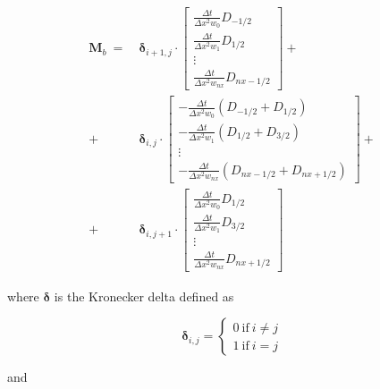 \documentclass[journal abbreviation, manuscript]{copernicus}
\begin{document}
\begin{equation}
\begin{aligned}
    \boldsymbol{M}_b ~=~ 
    &\boldsymbol{\delta}_{i+1, j} \cdot 
    \begin{bmatrix}
        \frac{\Delta t}{\Delta x^2 w_0} D_{-1/2} \\
        \frac{\Delta t}{\Delta x^2 w_1} D_{1/2} \\
        \vdots \\
        \frac{\Delta t}{\Delta x^2 w_{nx}} D_{nx - 1/2}
    \end{bmatrix}
    + \\
    +~&\boldsymbol{\delta}_{i, j} \cdot
    \begin{bmatrix}
        - \frac{\Delta t}{\Delta x^2 w_0} (D_{-1/2} + D_{1/2}) \\
        - \frac{\Delta t}{\Delta x^2 w_1} (D_{1/2} + D_{3/2}) \\
        \vdots \\
        - \frac{\Delta t}{\Delta x^2 w_{nx}} (D_{nx - 1/2} + D_{nx + 1/2})
    \end{bmatrix}
    + \\
    +~&\boldsymbol{\delta}_{i, j+1} \cdot
    \begin{bmatrix}
        \frac{\Delta t}{\Delta x^2 w_0} D_{1/2} \\
        \frac{\Delta t}{\Delta x^2 w_1} D_{3/2} \\
        \vdots \\
        \frac{\Delta t}{\Delta x^2 w_{nx}} D_{nx + 1/2}
    \end{bmatrix}
\end{aligned}
\end{equation}

\noindent where $\boldsymbol{\delta}$ is the Kronecker delta defined as

\begin{equation}
    \boldsymbol{\delta}_{i, j} = 
    \begin{cases}
    0 ~\mathrm{if}~ i \neq j \\
    1 ~\mathrm{if}~ i = j
    \end{cases}
\end{equation}

\noindent and 
\end{document}
